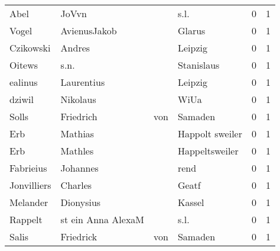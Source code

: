 \documentclass[10pt,a4paper,landscape]{article}
\begin{document}
\begin{longtable}{llllrr}
                     Abel &                              JoVvn &             &                                        s.l. &          0 &         1 \\
                    Vogel &                       AvienusJakob &             &                                      Glarus &          0 &         1 \\
                Czikowski &                             Andres &             &                                     Leipzig &          0 &         1 \\
                   Oitews &                               s.n. &             &                                  Stanislaus &          0 &         1 \\
                  ealinus &                         Laurentius &             &                                     Leipzig &          0 &         1 \\
                   dziwil &                           Nikolaus &             &                                        WiUa &          0 &         1 \\
                    Solls &                          Friedrich &         von &                                     Samaden &          0 &         1 \\
                      Erb &                            Mathias &             &                             Happolt sweiler &          0 &         1 \\
                      Erb &                            Mathles &             &                              Happeltsweiler &          0 &         1 \\
                Fabrieius &                           Johannes &             &                                        rend &          0 &         1 \\
              Jonvilliers &                            Charles &             &                                       Geatf &          0 &         1 \\
                 Melander &                          Dionysius &             &                                      Kassel &          0 &         1 \\
                  Rappelt &                 st ein Anna AlexaM &             &                                        s.l. &          0 &         1 \\
                    Salis &                          Friedrick &         von &                                     Samaden &          0 &         1 \\

\end{longtable}
\end{document}
